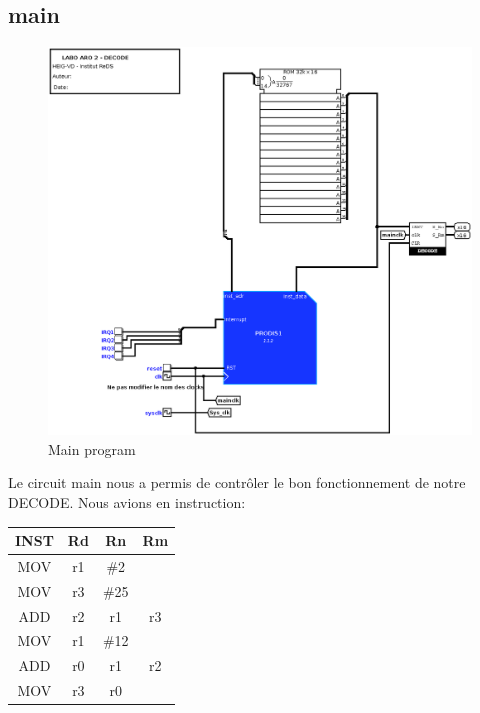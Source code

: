 \documentclass[a4paper]{article} %
\begin{document}
\subsection{main}
\begin{figure}[H]
    \centering
    \includegraphics[width=1\textwidth]{src/Et4_main.png}
    \caption{Main program}
    \label{main_img}
\end{figure}

Le circuit main nous a permis de contrôler le bon fonctionnement de notre DECODE. Nous avions en instruction: \\


\begin{tabular}{|c|c|c|c|}
    
    \hline
    INST & Rd & Rn  & Rm  \\
    \hline
    MOV  & r1 & \#2  &    \\
    \hline
    MOV  & r3 & \#25 &    \\
    \hline
    ADD  & r2 & r1   & r3 \\
    \hline
    MOV  & r1 & \#12 &    \\
    \hline
    ADD  & r0 & r1   & r2 \\
    \hline
    MOV  & r3 & r0   &    \\
    \hline
\end{tabular}
\end{document}
